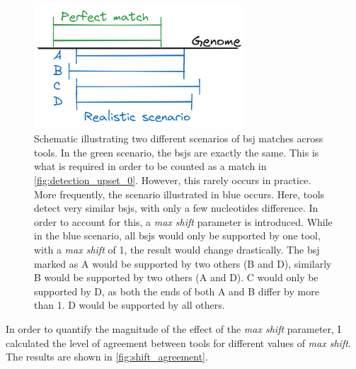 \begin{figure}[H] \centering

    \includegraphics[width=0.7\textwidth]{chapters/4_results_and_discussion/figures/grouping.png}
    \caption{Schematic illustrating two different scenarios of \gls{bsj}
        matches
        across tools.
        In the green scenario, the \glspl{bsj} are exactly the same.
        This is what is required in order to be counted as a match in
        \cref{fig:detection_upset_0}.
        However, this rarely occurs in practice.
        More frequently, the scenario illustrated in blue occurs.
        Here, tools detect very similar \glspl{bsj}, with only a few nucleotides
        difference.
        In order to account for this, a \textit{max shift} parameter is introduced.
        While in the blue scenario, all \glspl{bsj} would only be supported by one tool,
        with a \textit{max shift} of 1, the result would change drastically.
        The \gls{bsj} marked as A would be supported by two others (B and D), similarly
        B would be supported by two others (A and D).
        C would only be supported by D, as both the ends of both A and B differ by more
        than 1.
        D would be supported by all others.
    }
    \label{fig:detection_shift_schematic}
\end{figure}

In order to quantify the magnitude of the effect of the \textit{max shift}
parameter, I calculated the level of agreement between tools for different
values of \textit{max shift}.
The results are shown in \cref{fig:shift_agreement}.

